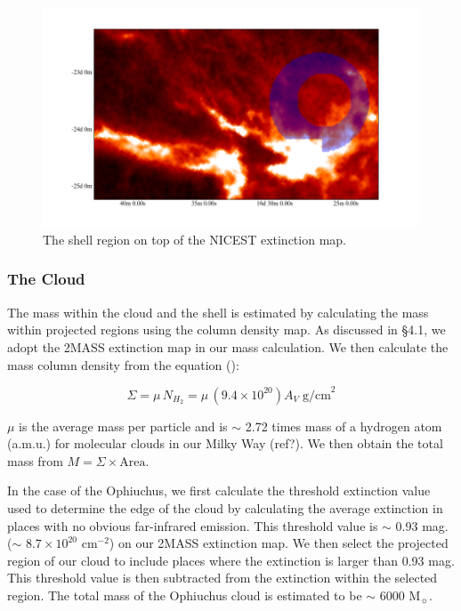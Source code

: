 \documentclass[11pt,a4paper]{emulateapj}
\begin{document}
\begin{figure}[ht]
\centering
\includegraphics[scale=0.5]{fig/shell_2mass.png}
\caption{The shell region on top of the NICEST extinction map.
}
\end{figure}

\subsubsection{The Cloud}
The mass within the cloud and the shell is estimated by calculating the mass within projected regions using the column density map. As discussed in \S4.1, we adopt the 2MASS extinction map in our mass calculation. We then calculate the mass column density from the equation (\citet{Arce_2001}):

\begin{equation}
\Sigma = \mu\,N_{H_2} = \mu\,(9.4\times10^{20})A_V\;\text{g/cm}^2
\end{equation}

$\mu$ is the average mass per particle and is $\sim$ 2.72 times mass of a hydrogen atom (a.m.u.) for molecular clouds in our Milky Way (ref?). We then obtain the total mass from $M = \Sigma\times \text{Area}$.

In the case of the Ophiuchus, we first calculate the threshold extinction value used to determine the edge of the cloud by calculating the average extinction in places with no obvious far-infrared emission. This threshold value is $\sim$ 0.93 mag. ($\sim$ $8.7 \times 10^{20}$ cm$^{-2}$) on our 2MASS extinction map. We then select the projected region of our cloud to include places where the extinction is larger than 0.93 mag. This threshold value is then subtracted from the extinction within the selected region. The total mass of the Ophiuchus cloud is estimated to be $\sim$ 6000 M$_{\sun}$.
\end{document}
